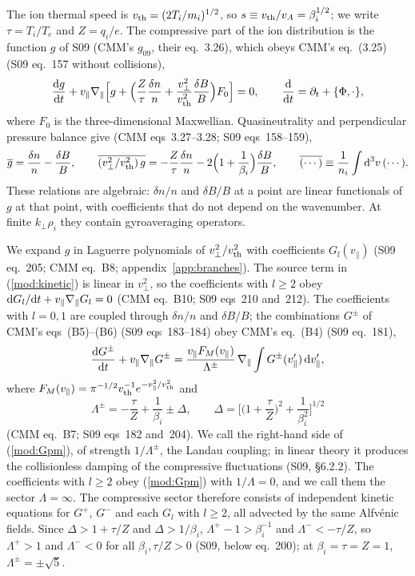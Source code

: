 The ion thermal speed is $v_{\mathrm{th}}=(2T_i/m_i)^{1/2}$, so $s\equiv v_{\mathrm{th}}/v_A=\beta_i^{1/2}$; we write $\tau=T_i/T_e$ and $Z=q_i/e$. The compressive part of the ion distribution is the function $g$ of S09 (CMM's $g_{09}$, their eq.~3.26), which obeys CMM's eq.~(3.25) (S09 eq.~157 without collisions),
\begin{equation}\label{mod:kinetic}
  \frac{\mathrm{d} g}{\mathrm{d} t}+v_\parallel\nabla_\parallel\Big[g+\Big(\frac{Z}{\tau}\frac{\delta n}{n}+\frac{v_\perp^2}{v_{\mathrm{th}}^2}\frac{\delta B}{B}\Big)F_0\Big]=0,
  \qquad \frac{\mathrm{d}}{\mathrm{d} t}=\partial_t+\{\Phi,\cdot\},
\end{equation}
where $F_0$ is the three-dimensional Maxwellian. Quasineutrality and perpendicular pressure balance give (CMM eqs~3.27--3.28; S09 eqs~158--159),
\begin{equation}\label{mod:fields}
  \overline{g}=\frac{\delta n}{n}-\frac{\delta B}{B},\qquad
  \overline{(v_\perp^2/v_{\mathrm{th}}^2)\,g}=-\frac{Z}{\tau}\frac{\delta n}{n}-2\Big(1+\frac{1}{\beta_i}\Big)\frac{\delta B}{B},
  \qquad \overline{(\cdots)}\equiv\frac{1}{n_i}\int\mathrm{d}^3v\,(\cdots).
\end{equation}
These relations are algebraic: $\delta n/n$ and $\delta B/B$ at a point are linear functionals of $g$ at that point, with coefficients that do not depend on the wavenumber. At finite $k_\perp\rho_i$ they contain gyroaveraging operators.

We expand $g$ in Laguerre polynomials of $v_\perp^2/v_{\mathrm{th}}^2$ with coefficients $G_l(v_\parallel)$ (S09 eq.~205; CMM eq.~B8; appendix~\ref{app:branches}). The source term in (\ref{mod:kinetic}) is linear in $v_\perp^2$, so the coefficients with $l\ge2$ obey $\mathrm{d} G_l/\mathrm{d} t+v_\parallel\nabla_\parallel G_l=0$ (CMM eq.~B10; S09 eqs~210 and~212). The coefficients with $l=0,1$ are coupled through $\delta n/n$ and $\delta B/B$; the combinations $G^\pm$ of CMM's eqs~(B5)--(B6) (S09 eqs~183--184) obey CMM's eq.~(B4) (S09 eq.~181),
\begin{equation}\label{mod:Gpm}
  \frac{\mathrm{d} G^\pm}{\mathrm{d} t}+v_\parallel\nabla_\parallel G^\pm
  =\frac{v_\parallel F_M(v_\parallel)}{\Lambda^\pm}\,\nabla_\parallel\int G^\pm(v_\parallel')\,\mathrm{d} v_\parallel',
\end{equation}
where $F_M(v_\parallel)=\pi^{-1/2}v_{\mathrm{th}}^{-1}e^{-v_\parallel^2/v_{\mathrm{th}}^2}$ and
\begin{equation}\label{eq:Lambdapm}
  \Lambda^\pm=-\frac{\tau}{Z}+\frac{1}{\beta_i}\pm\Delta,\qquad
  \Delta=\Big[\Big(1+\frac{\tau}{Z}\Big)^2+\frac{1}{\beta_i^2}\Big]^{1/2}
\end{equation}
(CMM eq.~B7; S09 eqs~182 and~204). We call the right-hand side of (\ref{mod:Gpm}), of strength $1/\Lambda^\pm$, the Landau coupling; in linear theory it produces the collisionless damping of the compressive fluctuations (S09, \S6.2.2). The coefficients with $l\ge2$ obey (\ref{mod:Gpm}) with $1/\Lambda=0$, and we call them the sector $\Lambda=\infty$. The compressive sector therefore consists of independent kinetic equations for $G^+$, $G^-$ and each $G_l$ with $l\ge2$, all advected by the same Alfv\'enic fields. Since $\Delta>1+\tau/Z$ and $\Delta>1/\beta_i$, $\Lambda^+-1>\beta_i^{-1}$ and $\Lambda^-<-\tau/Z$, so $\Lambda^+>1$ and $\Lambda^-<0$ for all $\beta_i,\tau/Z>0$ (S09, below eq.~200); at $\beta_i=\tau=Z=1$, $\Lambda^\pm=\pm\sqrt5$.

